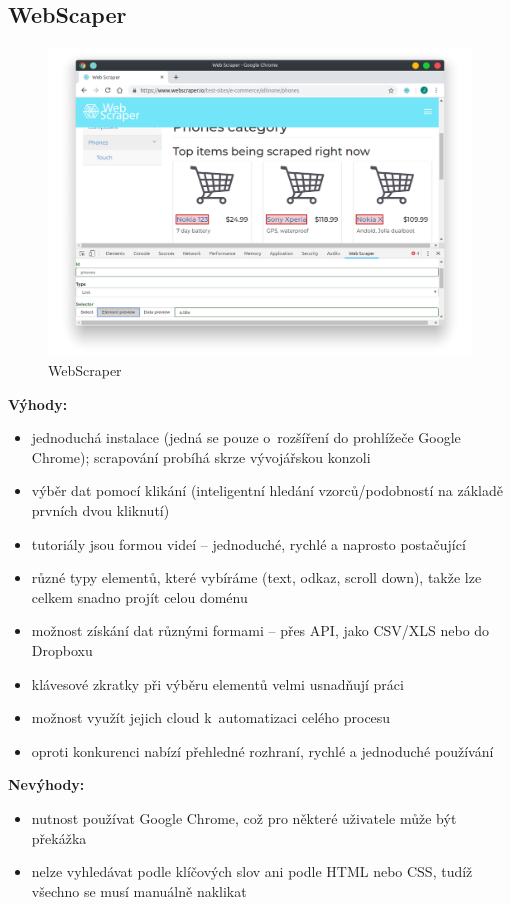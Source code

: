 \documentclass[thesis=B,czech]{FITthesis2}[2012/06/26]
\begin{document}
	
	\newpage
	\subsection{WebScaper}
	\begin{figure}
		\includegraphics[width=\linewidth]{images/WebScraper.png}
		\caption{WebScraper\cite[snímek pořídil autor]{webscraper}}
		\label{fig:webScraper}
	\end{figure}
	\textbf{Výhody:}
	\begin{itemize}
		\item jednoduchá instalace (jedná se pouze o~rozšíření do prohlížeče Google Chrome); scrapování probíhá skrze vývojářskou konzoli
		\item výběr dat pomocí klikání (inteligentní hledání vzorců/podobností na základě prvních dvou kliknutí)
		\item tutoriály jsou formou videí -- jednoduché, rychlé a naprosto postačující
		\item různé typy elementů, které vybíráme (text, odkaz, scroll down), takže lze celkem snadno projít celou doménu
		\item možnost získání dat různými formami -- přes API, jako CSV/XLS nebo do Dropboxu
		\item klávesové zkratky při výběru elementů velmi usnadňují práci
		\item možnost využít jejich cloud k~automatizaci celého procesu
		\item oproti konkurenci nabízí přehledné rozhraní, rychlé a jednoduché používání
	\end{itemize}
	\textbf{Nevýhody:}
	\begin{itemize}
		\item nutnost používat Google Chrome, což pro některé uživatele může být překážka
		\item nelze vyhledávat podle klíčových slov ani podle HTML nebo CSS, tudíž všechno se musí manuálně naklikat
	\end{itemize}
	
\end{document}
